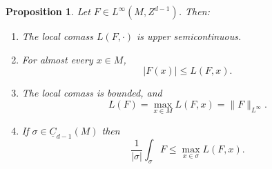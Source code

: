 \documentclass[reqno,11pt]{amsart}
\newcommand*\dif{\mathop{}\!\mathrm{d}}
\newcommand{\Chain}{\underline C}
\newtheorem{proposition}[theorem]{Proposition}
\theoremstyle{definition}
\numberwithin{equation}{section}
\begin{document}
\begin{proposition}\label{crandall}
Let $F \in L^\infty(M, Z^{d - 1})$. Then:
\begin{enumerate}
\item The local comass $L(F, \cdot)$ is upper semicontinuous. \label{crandall usc}
\item For almost every $x \in M$,
$$|F(x)| \leq L(F, x).$$
\label{crandall LDT}
\item The local comass is bounded, and \label{crandall linfinity}
$$L(F) = \max_{x \in M} L(F, x) = \|F\|_{L^\infty}.$$
\item If $\sigma \in \Chain_{d - 1}(M)$ then \label{crandall best curl is ABC}
$$\frac{1}{|\sigma|} \int_\sigma F \leq \max_{x \in \sigma} L(F, x).$$
\end{enumerate}
\end{proposition}
\end{document}

